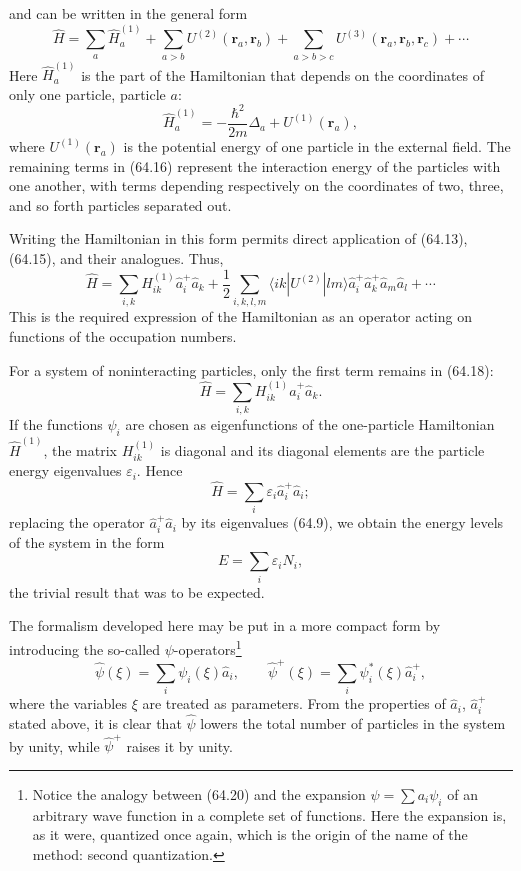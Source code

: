 and can be written in the general form
\begin{equation}
 \hat H=\sum_a\hat H_a^{(1)}+\sum_{a>b}U^{(2)}(\mathbf r_a,\mathbf r_b)
 +\sum_{a>b>c}U^{(3)}(\mathbf r_a,\mathbf r_b,\mathbf r_c)+\cdots
 \tag{64.16}
\end{equation}
Here $\hat H_a^{(1)}$ is the part of the Hamiltonian that depends on the coordinates of only one particle, particle $a$:
\begin{equation}
 \hat H_a^{(1)}=-\frac{\hbar^2}{2m}\Delta_a+U^{(1)}(\mathbf r_a),
 \tag{64.17}
\end{equation}
where $U^{(1)}(\mathbf r_a)$ is the potential energy of one particle in the external field. The remaining terms in (64.16) represent the interaction energy of the particles with one another, with terms depending respectively on the coordinates of two, three, and so forth particles separated out.

Writing the Hamiltonian in this form permits direct application of (64.13), (64.15), and their analogues. Thus,
\begin{equation}
 \hat H=\sum_{i,k}H_{ik}^{(1)}\hat a_i^+\hat a_k
 +\frac12\sum_{i,k,l,m}\langle ik|U^{(2)}|lm\rangle
 \hat a_i^+\hat a_k^+\hat a_m\hat a_l+\cdots
 \tag{64.18}
\end{equation}
This is the required expression of the Hamiltonian as an operator acting on functions of the occupation numbers.

For a system of noninteracting particles, only the first term remains in (64.18):
\begin{equation}
 \hat H=\sum_{i,k}H_{ik}^{(1)}\hat a_i^+\hat a_k.
 \tag{64.19}
\end{equation}
If the functions $\psi_i$ are chosen as eigenfunctions of the one-particle Hamiltonian $\hat H^{(1)}$, the matrix $H_{ik}^{(1)}$ is diagonal and its diagonal elements are the particle energy eigenvalues $\varepsilon_i$. Hence
\[
 \hat H=\sum_i\varepsilon_i\hat a_i^+\hat a_i;
\]
replacing the operator $\hat a_i^+\hat a_i$ by its eigenvalues (64.9), we obtain the energy levels of the system in the form
\[
 E=\sum_i\varepsilon_iN_i,
\]
the trivial result that was to be expected.

The formalism developed here may be put in a more compact form by introducing the so-called $\psi$-operators\footnote{Notice the analogy between (64.20) and the expansion $\psi=\sum a_i\psi_i$ of an arbitrary wave function in a complete set of functions. Here the expansion is, as it were, quantized once again, which is the origin of the name of the method: second quantization.}
\begin{equation}
 \hat\psi(\xi)=\sum_i\psi_i(\xi)\hat a_i,\qquad
 \hat\psi^+(\xi)=\sum_i\psi_i^*(\xi)\hat a_i^+,
 \tag{64.20}
\end{equation}
where the variables $\xi$ are treated as parameters. From the properties of $\hat a_i$, $\hat a_i^+$ stated above, it is clear that $\hat\psi$ lowers the total number of particles in the system by unity, while $\hat\psi^+$ raises it by unity.

